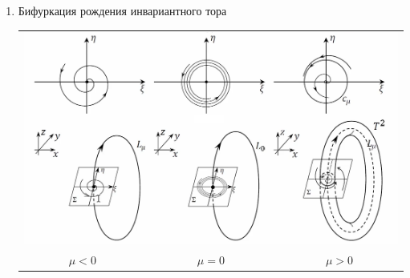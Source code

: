 \begin{multicols*}{2}
\begin{enumerate}
			\item Бифуркация рождения инвариантного тора \\
			\begin{tabular*}{0.5\textwidth}{@{\extracolsep{\fill}}ccc}
				\multicolumn{3}{l}{\includegraphics[width=0.9\linewidth]{tk_img/15_3.png}} \\
				\multicolumn{1}{c}{\quad\quad\quad\quad\quad\quad$\mu<0$} & 
				\multicolumn{1}{c}{\quad\quad\quad\quad\quad\quad$\mu=0$} &
				\multicolumn{1}{c}{$\mu>0$} 
			\end{tabular*}
		\end{enumerate}
	\end{multicols*}


